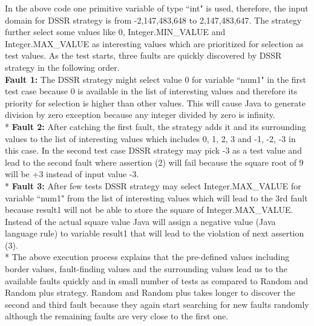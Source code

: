 \documentclass[conference]{IEEEtran}
\begin{document}
\endgroup
In the above code one primitive variable of type ``int" is used, therefore, the input domain for DSSR strategy is from -2,147,483,648 to 2,147,483,647. The strategy further select some values like 0, Integer.MIN\_VALUE and Integer.MAX\_VALUE as interesting values which are prioritized for selection as test values. 
As the test starts, three faults are quickly discovered by DSSR strategy in the following order.\\
\indent \textbf{Fault 1:} The DSSR strategy might select value 0 for variable ``num1"  in the first test case because 0 is available in the list of interesting values and therefore its priority for selection is higher than other values. This will cause Java to generate division by zero exception because any integer divided by zero is infinity.\\*
\indent \textbf{Fault 2:} After catching the first fault, the strategy adds it and its surrounding values to the list of interesting values which includes 0, 1, 2, 3 and -1, -2, -3 in this case. In the second test case DSSR strategy may pick -3 as a test value and lead to the second fault where assertion (2) will fail because the square root of 9 will be +3 instead of input value -3.\\*
\indent \textbf{Fault 3:} After few tests DSSR strategy may select Integer.MAX\_VALUE for variable ``num1"  from the list of interesting values which will lead to the 3rd fault because result1 will not be able to store the square of Integer.MAX\_VALUE. Instead of the actual square value Java will assign a negative value (Java language rule) to variable result1 that will lead to the violation of next assertion (3).\\*
\indent The above execution process explains that the pre-defined values including border values, fault-finding values and the surrounding values lead us to the available faults quickly and in small number of tests as compared to Random and Random plus strategy. Random and Random plus takes longer to discover the second and third fault because they again start searching for new faults randomly although the remaining faults are very close to the first one. 



\end{document}
